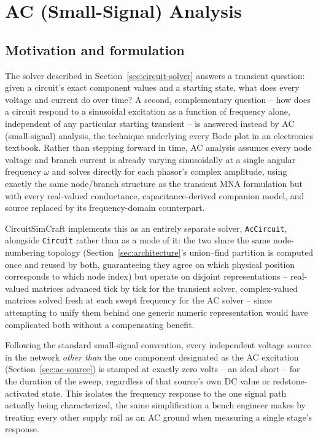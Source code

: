 \section{AC (Small-Signal) Analysis}
\label{sec:ac-analysis}

\subsection{Motivation and formulation}

The solver described in Section~\ref{sec:circuit-solver} answers a transient question: given a
circuit's exact component values and a starting state, what does every voltage and current do
over time? A second, complementary question -- how does a circuit respond to a sinusoidal
excitation as a function of frequency alone, independent of any particular starting transient --
is answered instead by AC (small-signal) analysis, the technique underlying every Bode plot in
an electronics textbook. Rather than stepping forward in time, AC analysis assumes every
node voltage and branch current is already varying sinusoidally at a single angular frequency
$\omega$ and solves directly for each phasor's complex amplitude, using exactly the same
node/branch structure as the transient MNA formulation but with every real-valued conductance,
capacitance-derived companion model, and source replaced by its frequency-domain counterpart.

CircuitSimCraft implements this as an entirely separate solver, \texttt{AcCircuit}, alongside
\texttt{Circuit} rather than as a mode of it: the two share the same node-numbering topology
(Section~\ref{sec:architecture}'s union--find partition is computed once and reused by both,
guaranteeing they agree on which physical position corresponds to which node index) but operate
on disjoint representations -- real-valued matrices advanced tick by tick for the transient
solver, complex-valued matrices solved fresh at each swept frequency for the AC solver -- since
attempting to unify them behind one generic numeric representation would have complicated both
without a compensating benefit.

Following the standard small-signal convention, every independent voltage source in the network
\emph{other than} the one component designated as the AC excitation (Section~\ref{sec:ac-source})
is stamped at exactly zero volts -- an ideal short -- for the duration of the sweep, regardless of
that source's own DC value or redstone-activated state. This isolates the frequency response to
the one signal path actually being characterized, the same simplification a bench engineer makes
by treating every other supply rail as an AC ground when measuring a single stage's response.

